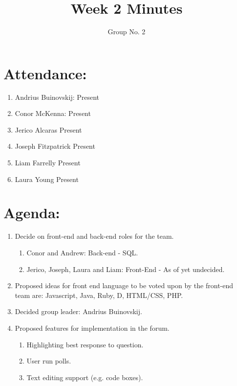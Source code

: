 \documentclass[a4paper, 12pt]{article}
\begin{document}
\title{Week 2 Minutes}
\author{Group No. 2}
\maketitle

	\section{Attendance:}
		\begin{enumerate}[label*=\arabic*.]
			\item Andrius Buinovskij:	\dotfill Present
			\item Conor McKenna:		\dotfill Present
			\item Jerico Alcaras		\dotfill Present
			\item Joseph Fitzpatrick	\dotfill Present
			\item Liam Farrelly		\dotfill Present
			\item Laura Young		\dotfill Present
		\end{enumerate}

	\section{Agenda:}
		\begin{enumerate}[label*=\arabic*.]
			\item Decide on front-end and back-end roles for the team.
			\begin{enumerate}[label*=\arabic*.]
				\item Conor and Andrew: Back-end - SQL.
				\item Jerico, Joseph, Laura and Liam: Front-End - As of yet undecided.
			\end{enumerate}	
			\item Proposed ideas for front end language to be voted upon by the front-end team are:
			Javascript, Java, Ruby, D, HTML/CSS, PHP.
			\item Decided group leader: Andrius Buinovskij.
			\item Proposed features for implementation in the forum.
			\begin{enumerate}[label*=\arabic*.]
				\item Highlighting best response to question.
				\item User run polls.
				\item Text editing support (e.g. code boxes).
			\end{enumerate}
		\end{enumerate}
\end{document}
